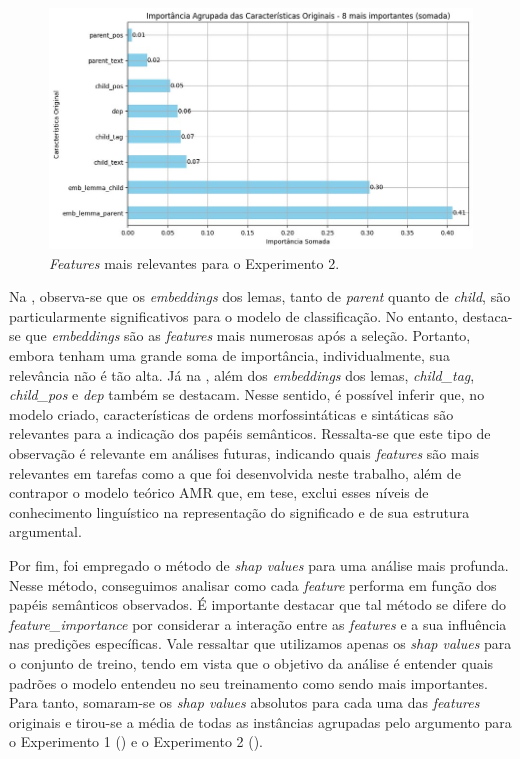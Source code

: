 \begin{figure}[htbp]
  \centering
  \begin{minipage}{.75\textwidth}
  \includegraphics[width=\textwidth]{figure07.jpg}
  \caption{\emph{Features} mais relevantes para o Experimento 2.}
  \label{fig-07}
  \end{minipage}
\end{figure}


Na , observa-se que os \emph{embeddings} dos lemas, tanto de
\emph{parent} quanto de \emph{child}, são particularmente significativos
para o modelo de classificação. No entanto, destaca-se que
\emph{embeddings} são as \emph{features} mais numerosas após a seleção.
Portanto, embora tenham uma grande soma de importância, individualmente,
sua relevância não é tão alta. Já na , além dos
\emph{embeddings} dos lemas, \emph{child\_tag}, \emph{child\_pos} e
\emph{dep} também se destacam. Nesse sentido, é possível inferir que, no
modelo criado, características de ordens morfossintáticas e sintáticas
são relevantes para a indicação dos papéis semânticos. Ressalta-se que
este tipo de observação é relevante em análises futuras, indicando quais
\emph{features} são mais relevantes em tarefas como a que foi
desenvolvida neste trabalho, além de contrapor o modelo teórico AMR que,
em tese, exclui esses níveis de conhecimento linguístico na
representação do significado e de sua estrutura argumental.

Por fim, foi empregado o método de \emph{shap values} para uma análise
mais profunda. Nesse método, conseguimos analisar como cada
\emph{feature} performa em função dos papéis semânticos observados. É
importante destacar que tal método se difere do
\emph{feature\_importance} por considerar a interação entre as
\emph{features} e a sua influência nas predições específicas. Vale
ressaltar que utilizamos apenas os \emph{shap values} para o conjunto de
treino, tendo em vista que o objetivo da análise é entender quais
padrões o modelo entendeu no seu treinamento como sendo mais
importantes. Para tanto, somaram-se os \emph{shap values} absolutos para
cada uma das \emph{features} originais e tirou-se a média de todas as
instâncias agrupadas pelo argumento para o Experimento 1 () e o Experimento 2 ().

